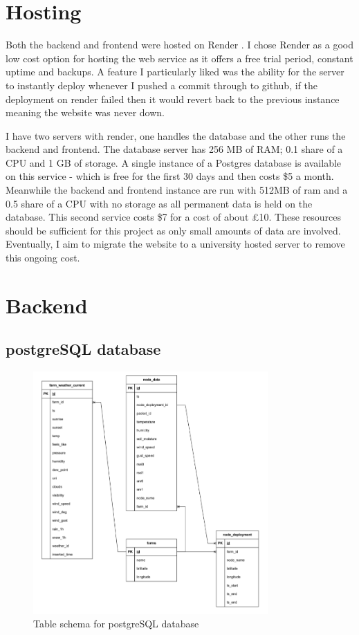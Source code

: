 \section{Hosting}

Both the backend and frontend were hosted on Render \cite{render}. I chose
Render as a good low cost option for hosting the web service as it offers a free
trial period, constant uptime and backups. A feature I particularly liked was
the ability for the server to instantly deploy whenever I pushed a commit
through to github, if the deployment on render failed then it would revert back
to the previous instance meaning the website was never down. 

I have two servers with render, one handles the database and the other runs the
backend and frontend. The database server has 256 MB of RAM; 0.1 share of a CPU
and 1 GB of storage. A single instance of a Postgres database is available on
this service - which is free for the first 30 days and then costs \$5 a month.
Meanwhile the backend and frontend instance are run with 512MB of ram and a 0.5
share of a CPU with no storage as all permanent data is held on the database.
This second service costs \$7 for a cost of about £10. These resources should be
sufficient for this project as only small amounts of data are involved.
Eventually, I aim to migrate the website to a university hosted server to remove
this ongoing cost.

\section{Backend}

\subsection{postgreSQL database}\label{sec:database}

\begin{figure}[H]
    \centering
    \includegraphics[width=0.8\textwidth]{contents/part-3/fig3/postgres_diagram.png}
    \caption{Table schema for postgreSQL database}
    \label{fig:db_schema}
\end{figure}

